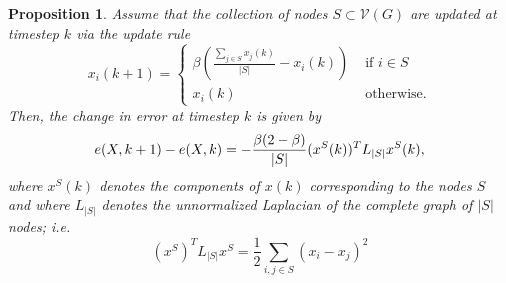 \documentclass{amsart}
\DeclareMathOperator{\E}{E}
\DeclareMathOperator{\Var}{Var}
\newtheorem{proposition}{Proposition}
\theoremstyle{remark}
\begin{document}


\begin{proposition}{\label{prop:discChangeImproved}}
	Assume that the collection of nodes $S\subset\mathcal{V}(G)$ are updated at timestep $k$ via the update rule
	\begin{equation}
		x_i(k+1) = \begin{cases}
			\beta(\frac{\sum_{j\in S}x_j(k)}{|S|}-x_i(k)) & \text{ if } i\in S\\
			x_i(k) & \text{ otherwise}.
		\end{cases}
	\end{equation}
	Then, the change in error at timestep $k$ is given by
	\begin{equation}{\label{prop:discChangeImproved:eq:errorDecrease}}
		e(X,k+1) - e(X,k) = -\frac{\beta(2-\beta)}{|S|}(x^S(k))^TL_{|S|}x^S(k),
	\end{equation}
	where $x^S(k)$ denotes the components of $x(k)$ corresponding to the nodes $S$ and where $L_{|S|}$ denotes the unnormalized Laplacian of the complete graph of $|S|$ nodes; i.e.
	\begin{equation}
		(x^S)^TL_{|S|}x^S = \frac{1}{2}\sum_{i,j\in S}(x_i-x_j)^2
	\end{equation}
\end{proposition}
\end{document}
